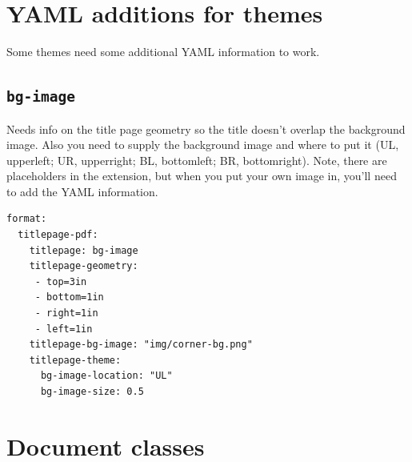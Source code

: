 \documentclass[
  oneside,
  open=any]{scrbook}
\renewcommand*\contentsname{Table of contents}
\newcommand\contentsname{Table of contents}
\begin{document}
\begin{frontmatter}
\begin{titlepage}
\begin{minipage}[b][\textheight][s]{\minipagewidth}
\authorblock

\affiliationblock

\vfill

\logoblock

\footerblock
\par

\end{minipage}
\clearpage
\restoregeometry
\end{titlepage}
\setcounter{page}{1}
\end{frontmatter}


\renewcommand*\contentsname{Table of contents}
{
\setcounter{tocdepth}{2}
\tableofcontents
}
\listoffigures
\listoftables

\mainmatter
\section{YAML additions for themes}\label{yaml-additions-for-themes}

Some themes need some additional YAML information to work.

\subsection{\texorpdfstring{\texttt{bg-image}}{bg-image}}\label{bg-image}

Needs info on the title page geometry so the title doesn't overlap the
background image. Also you need to supply the background image and where
to put it (UL, upperleft; UR, upperright; BL, bottomleft; BR,
bottomright). Note, there are placeholders in the extension, but when
you put your own image in, you'll need to add the YAML information.

\begin{verbatim}
format: 
  titlepage-pdf:
    titlepage: bg-image
    titlepage-geometry: 
     - top=3in
     - bottom=1in
     - right=1in
     - left=1in
    titlepage-bg-image: "img/corner-bg.png"
    titlepage-theme:
      bg-image-location: "UL"
      bg-image-size: 0.5
\end{verbatim}

\section{Document classes}\label{document-classes}
\end{document}
